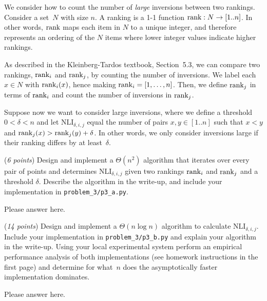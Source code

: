 \documentclass{hw}
\begin{document}
\newpage

\newcommand{\rank}{\textnormal{rank}}
\newcommand{\Colon}{:}
\newcommand{\dotdot}{..}
\newcommand{\numinv}{\textrm{NI}}
\newcommand{\numlargeinv}{\textrm{NLI}}

\begin{problem}
  We consider how to count the number of \emph{large} inversions between two
  rankings. Consider a set~$N$ with size $n$. 
  A ranking is a 1-1 function $\rank\Colon N
  \rightarrow [1\dotdot n]$. In other words, $\rank$ maps each item in $N$ to a unique
  integer, and therefore represents an ordering of the $N$ items where lower
  integer values indicate higher rankings. 

  As described in the Kleinberg-Tardos textbook, Section~5.3, we can compare two rankings, $\rank_i$ and $\rank_j$, by counting the number of
  inversions. We label each $x \in N$ with $\rank_i(x)$, hence making $\rank_i = [1, \dots ,n]$. Then, we define $\rank_j$ in terms of $\rank_i$ and count the number of inversions in $\rank_j$. 

  Suppose now we want to consider large inversions, where we define a threshold
  $0 < \delta < n$ and let $\numlargeinv_{\delta,i,j}$ equal the number of pairs
  $x,y \in [1\dotdot n]$ such that $x < y$ and $\rank_j(x) > \rank_j(y) + \delta$. In other words, we only consider inversions large if their ranking differs by at
  least~$\delta$.
  \begin{subproblem}
    (\textit{6 points})
    Design and implement a $\Theta(n^2)$ algorithm that iterates over every pair
    of points and determines $\numlargeinv_{\delta,i,j}$ given two rankings
    $\rank_i$ and $\rank_j$ and a threshold $\delta$. Describe the algorithm in the write-up, and include your implementation in \texttt{problem\_3/p3\_a.py}.
  \end{subproblem}

\begin{solution}
Please answer here.
\end{solution}

  \begin{subproblem}
    (\textit{14 points})
    Design and implement a $\Theta(n\log n)$ algorithm to calculate
    $\numlargeinv_{\delta,i,j}$. Include your implementation in
    \texttt{problem\_3/p3\_b.py} and explain your algorithm in the write-up.
    Using your local experimental system perform
    an empirical performance analysis of both implementations (see homework
    instructions in the first page) and determine
    for what~$n$ does the asymptotically faster implementation dominates.
  \end{subproblem}

\begin{solution}
Please answer here.
\end{solution}

\end{problem}
\end{document}

